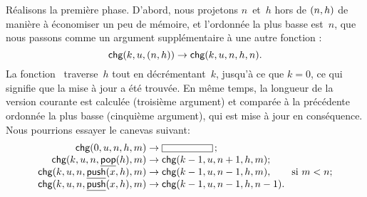 Réalisons la première phase. D'abord, nous projetons \(n\)~et~\(h\)
hors de \(({n},{h})\) de manière à économiser un peu de mémoire, et
l'ordonnée la plus basse est~\(n\), que nous passons comme un argument
supplémentaire à une autre fonction
:
\begin{equation*}
\textsf{chg}(k,u,({n},{h})) \rightarrow \textsf{chg}(k,u,n,h,n).
\end{equation*}
La fonction~ traverse~\(h\) tout en décrémentant~\(k\),
jusqu'à ce que \(k=0\), ce qui signifie que la mise à jour a été
trouvée. En même temps, la longueur de la version courante est
calculée (troisième argument) et comparée à la précédente ordonnée la
plus basse (cinquième argument), qui est mise à jour en
conséquence. Nous pourrions essayer le canevas suivant:
\begin{equation*}
\begin{array}{@{}r@{\;}l@{\;}l@{}}
\fun{chg}(0,u,n,h,m) & \rightarrow & \fbcode{CCCCCCC}\,;\\
\fun{chg}(k,u,n,\ufun{pop}(h),m) & \rightarrow
                                 & \fun{chg}(k-1,u,n+1,h,m);\\
\fun{chg}(k,u,n,\ufun{push}(x,h),m) & \rightarrow 
                   & \fun{chg}(k-1,u,n-1,h,m),\qquad \text{si \(m < n\)};\\
\fun{chg}(k,u,n,\ufun{push}(x,h),m) & \rightarrow
                                    & \fun{chg}(k-1,u,n-1,h,n-1).
\end{array}
\end{equation*}

